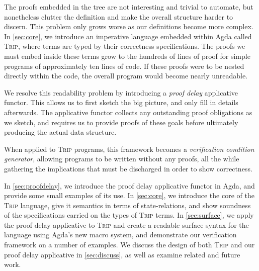 \documentclass[sigplan]{acmart}%
\begin{document}
The proofs embedded in the tree are not interesting and trivial to automate, but nonetheless
clutter the definition and make the overall structure harder to 
discern. This problem only grows worse as our definitions become more complex.
In \autoref{sec:core}, we introduce an imperative language embedded within Agda called \textsc{Trip},
where terms are typed by their correctness specifications. The proofs we must embed inside these 
terms grow to the hundreds of lines of proof for simple programs of approximately ten lines
of code. If these proofs were to be nested directly within the code, the 
overall program would become nearly unreadable.

We resolve this readability problem by introducing a \emph{proof delay}
applicative functor. This allows us to first sketch the big picture, 
and only fill in details afterwards. The applicative functor
collects any outstanding proof obligations as we sketch, and requires us 
to provide proofs of these goals before ultimately producing the actual data structure.


When applied to \textsc{Trip} programs, this framework becomes a 
\emph{verification condition generator}, allowing programs to be written 
without any proofs, all the while gathering the implications that must be discharged
in order to show correctness. 

In \autoref{sec:proofdelay}, we introduce the proof delay applicative functor in Agda, and provide 
some small examples of its use. In \autoref{sec:core}, we introduce the core of the \textsc{Trip}
language, give it semantics in terms of state-relations, and show soundness of the specifications
carried on the types of \textsc{Trip} terms. In \autoref{sec:surface}, we apply the proof delay 
applicative to \textsc{Trip} and create a readable surface syntax for the language using 
Agda's new macro system, and demonstrate our verification framework on a
number of examples. We discuss the design of both \textsc{Trip} and our proof delay 
applicative in \autoref{sec:discuss}, as well as examine related and future work. 
\end{document}
